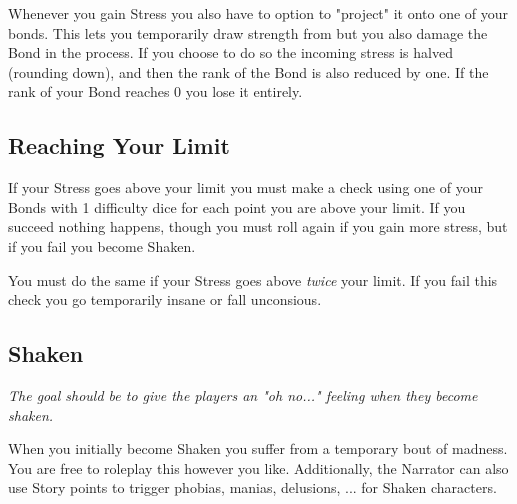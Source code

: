 \label{sanity-bonds}
Whenever you gain Stress you also have to option to "project" it onto one of your bonds.
This lets you temporarily draw strength from but you also damage the Bond in the process.
If you choose to do so the incoming stress is halved (rounding down), 
and then the rank of the Bond is also reduced by one.
If the rank of your Bond reaches 0 you lose it entirely.

\subsection{Reaching Your Limit}
If your Stress goes above your limit you must make a check using one of your Bonds with 1 difficulty dice for each point you are above your limit.
If you succeed nothing happens, though you must roll again if you gain more stress,
but if you fail you become Shaken.

You must do the same if your Stress goes above \textit{twice} your limit.
If you fail this check you go temporarily insane or fall unconsious.



\subsection{Shaken}
\textit{The goal should be to give the players an "oh no..." feeling when they become shaken.}

When you initially become Shaken you suffer from a temporary bout of madness. 
You are free to roleplay this however you like. 
Additionally, the Narrator can also use Story points to trigger 
phobias, manias, delusions, ... for Shaken characters.


